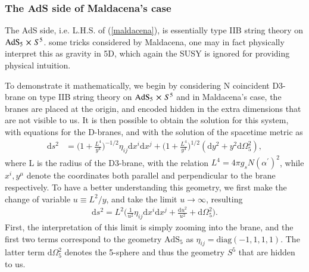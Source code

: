 \documentclass[a4paper, 12pt]{article}
\begin{document}
\subsubsection{The AdS side of Maldacena's case} 
\label{ads side}
  The AdS side, i.e. \textnormal{L.H.S.} of (\ref{maldacena}), is
  essentially type IIB string theory on \( \mathrm{AdS}_5 \cross S^{5}  \).
  some tricks considered by Maldacena, one may in fact
  physically interpret this as gravity in 5D, which again the SUSY is
  ignored for providing physical intuition. 

  To demonstrate it mathematically, we begin by considering N coincident
  D3-brane on type IIB string
  theory on \( \mathrm{AdS}_5 \cross S^{5}  \) and in Maldacena's case, the
  branes are placed at the origin, and encoded hidden in the extra
  dimensions that are not visible to us. It is then possible
  to obtain the solution for this system, with equations for the D-branes,
  and with the solution of the spacetime metric as
     \begin{align}
       \label{ads metric}
        \mathrm{d}s^2 &= \bigg( 1 + \frac{L^4}{y^4}  \bigg)^{-1/2}
     \eta_{ij} \mathrm{d}x^i \mathrm{d}x^j  + \bigg( 1 + \frac{L^4}{y^4}
       \bigg)^{1/2}(\mathrm{d}y^2
       + y^2 \mathrm{d}\Omega_5^2),
     \end{align} where L is the radius of the D3-brane, with the
     relation \( L^4 = 4 \pi g_s N(\alpha^{\prime})^2 \), while \(
     x^{i}, y^{\mu}   \) denote the coordinates both parallel and
     perpendicular to the brane respectively. To have a better
     understanding this geometry, we first make the change of
     variable \( u \equiv L^2/y  \), and take the limit \( u \to \infty
     \), resulting 
     \begin{align}
      \label{ads better metric}
        \mathrm{d}s^2 = L^2 \bigg( \frac{1}{u^2} \eta_{ij}
        \mathrm{d}x^i \mathrm{d}x^j  + \frac{\mathrm{d}u^2}{u^2}
        + \mathrm{d}\Omega_{5}^{2}\bigg).
    \end{align} First, the interpretation of this limit is simply zooming
    into the brane, and the first two terms
    correspond to the geometry \( \mathrm{AdS}_5 \) as \( \eta_{ij}
    = \mathrm{diag}(-1, 1, 1, 1)\). The latter term \(
    \mathrm{d}\Omega_{5}^{2} \) denotes the 5-sphere and thus the geometry
    \( S^5 \) that are hidden to us. 
\end{document}
